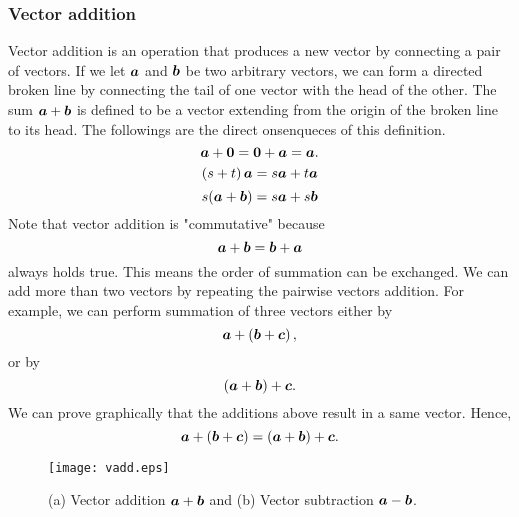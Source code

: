 \documentclass[10pt,a4j]{article}
\begin{document}
\subsubsection{Vector addition}
Vector addition is an operation that produces a new vector 
by connecting a pair of vectors. If we let $\mbox{\boldmath $a$}$ and $\mbox{\boldmath $b$}$ be two arbitrary vectors, we can form a directed broken line by connecting the tail of one vector with the head of the other. The sum $\mbox{\boldmath $a$}+\mbox{\boldmath $b$}$ is defined to be a vector extending from the origin of the broken line to its head. The followings are the direct onsenqueces of this definition.
\begin{equation}
    \mbox{\boldmath $a$}+\mbox{\boldmath $0$} = \mbox{\boldmath $0$}+\mbox{\boldmath $a$}=\mbox{\boldmath $a$}. 
    \label{eqn:add_zero_vec}
\end{equation}
\begin{equation}
    \left(s+t \right)\mbox{\boldmath $a$}= s\mbox{\boldmath $a$}+ t\mbox{\boldmath $a$}
    \label{eqn:dist_scalar}
\end{equation}
\begin{equation}
    s(\mbox{\boldmath $a$}+\mbox{\boldmath $b$})=s\mbox{\boldmath $a$}+s\mbox{\boldmath $b$}
    \label{eqn:dist_vec}
\end{equation}
Note that vector addition is "commutative" because 
\begin{equation}
    \mbox{\boldmath $a$}+\mbox{\boldmath $b$}=\mbox{\boldmath $b$}+\mbox{\boldmath $a$}
    \label{eqn:cmmt_vec_add}
\end{equation}
always holds true. This means the order of summation can be exchanged. We can add more than two vectors by repeating the pairwise vectors addition. For example, we can perform summation of three vectors either by 
\[
    \mbox{\boldmath $a$}+\left( \mbox{\boldmath $b$}+\mbox{\boldmath $c$} \right),
\]
or by 
\[
    \left( \mbox{\boldmath $a$}+\mbox{\boldmath $b$} \right) + \mbox{\boldmath $c$}.
\]
We can prove graphically that the additions above result in a same vector. Hence,
\begin{equation}
    \mbox{\boldmath $a$}+\left( \mbox{\boldmath $b$}+\mbox{\boldmath $c$} \right)
    =
    \left( \mbox{\boldmath $a$}+\mbox{\boldmath $b$} \right) + \mbox{\boldmath $c$}.
    \label{eqn:assct_vadd}
\end{equation}
\begin{figure}[h]
    \begin{center}
    \texttt{[image: vadd.eps]} 
    \end{center}
    \caption{(a) Vector addition $\mbox{\boldmath $a$}+\mbox{\boldmath $b$}$ and 
    (b) Vector subtraction $\mbox{\boldmath $a$}-\mbox{\boldmath $b$}$.} 
    \label{fig:1_4}
\end{figure}
%
\end{document}
